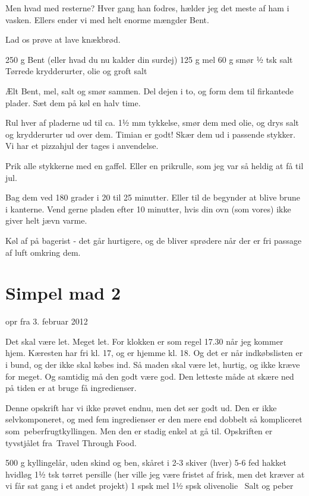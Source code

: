 \documentclass[
]{book}
\begin{document}
Men hvad med resterne? Hver gang han fodres, hælder jeg det meste af ham i vasken. Ellers ender vi med helt enorme mængder Bent.

Lad os prøve at lave knækbrød.

250 g Bent (eller hvad du nu kalder din surdej)
125 g mel
60 g smør
½ tsk salt
Tørrede krydderurter, olie og groft salt

Ælt Bent, mel, salt og smør sammen. Del dejen i to, og form dem til firkantede plader. Sæt dem på køl en halv time.

Rul hver af pladerne ud til ca. 1½ mm tykkelse, smør dem med olie, og drys salt og krydderurter ud over dem. Timian er godt! Skær dem ud i passende stykker. Vi har et pizzahjul der tages i anvendelse.

Prik alle stykkerne med en gaffel. Eller en prikrulle, som jeg var så heldig at få til jul.

Bag dem ved 180 grader i 20 til 25 minutter. Eller til de begynder at blive brune i kanterne. Vend gerne pladen efter 10 minutter, hvis din ovn (som vores) ikke giver helt jævn varme.

Køl af på bagerist - det går hurtigere, og de bliver sprødere når der er fri passage af luft omkring dem.

\hypertarget{simpel-mad-2}{%
\section{Simpel mad 2}\label{simpel-mad-2}}

opr fra 3. februar 2012

Det skal være let. Meget let. For klokken er som regel 17.30 når jeg kommer hjem. Kæresten har fri kl. 17, og er hjemme kl. 18. Og det er når indkøbslisten er i bund, og der ikke skal købes ind. Så maden skal være let, hurtig, og ikke kræve for meget. Og samtidig må den godt være god. Den letteste måde at skære ned på tiden er at bruge få ingredienser.~

Denne opskrift har vi ikke prøvet endnu, men det ser godt ud. Den er ikke selvkomponeret, og med fem ingredienser er den mere end dobbelt så kompliceret som~peberfrugtkyllingen. Men den er stadig enkel at gå til. Opskriften er tyvstjålet fra~Travel Through Food.

500 g kyllingelår, uden skind og ben, skåret i 2-3 skiver (hver)
5-6 fed hakket hvidløg
1½ tsk tørret persille (her ville jeg være fristet af frisk, men det kræver at vi får sat gang i et andet projekt)
1 spsk mel
1½ spsk olivenolie~
Salt og peber
\end{document}
